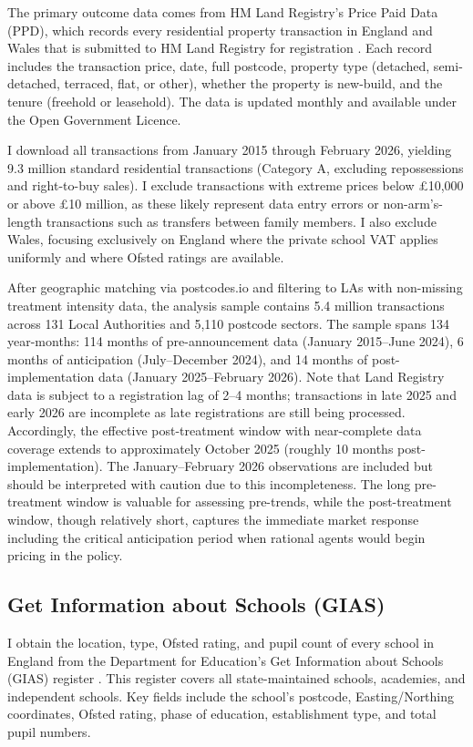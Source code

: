 \documentclass[12pt]{article}
\begin{document}
The primary outcome data comes from HM Land Registry's Price Paid Data (PPD), which records every residential property transaction in England and Wales that is submitted to HM Land Registry for registration \citep{landregistry2026}. Each record includes the transaction price, date, full postcode, property type (detached, semi-detached, terraced, flat, or other), whether the property is new-build, and the tenure (freehold or leasehold). The data is updated monthly and available under the Open Government Licence.

I download all transactions from January 2015 through February 2026, yielding 9.3 million standard residential transactions (Category A, excluding repossessions and right-to-buy sales). I exclude transactions with extreme prices below \pounds 10,000 or above \pounds 10 million, as these likely represent data entry errors or non-arm's-length transactions such as transfers between family members. I also exclude Wales, focusing exclusively on England where the private school VAT applies uniformly and where Ofsted ratings are available.

After geographic matching via postcodes.io and filtering to LAs with non-missing treatment intensity data, the analysis sample contains 5.4 million transactions across 131 Local Authorities and 5,110 postcode sectors. The sample spans 134 year-months: 114 months of pre-announcement data (January 2015--June 2024), 6 months of anticipation (July--December 2024), and 14 months of post-implementation data (January 2025--February 2026). Note that Land Registry data is subject to a registration lag of 2--4 months; transactions in late 2025 and early 2026 are incomplete as late registrations are still being processed. Accordingly, the effective post-treatment window with near-complete data coverage extends to approximately October 2025 (roughly 10 months post-implementation). The January--February 2026 observations are included but should be interpreted with caution due to this incompleteness. The long pre-treatment window is valuable for assessing pre-trends, while the post-treatment window, though relatively short, captures the immediate market response including the critical anticipation period when rational agents would begin pricing in the policy.

\subsection{Get Information about Schools (GIAS)}

I obtain the location, type, Ofsted rating, and pupil count of every school in England from the Department for Education's Get Information about Schools (GIAS) register \citep{gias2026}. This register covers all state-maintained schools, academies, and independent schools. Key fields include the school's postcode, Easting/Northing coordinates, Ofsted rating, phase of education, establishment type, and total pupil numbers.
\end{document}
